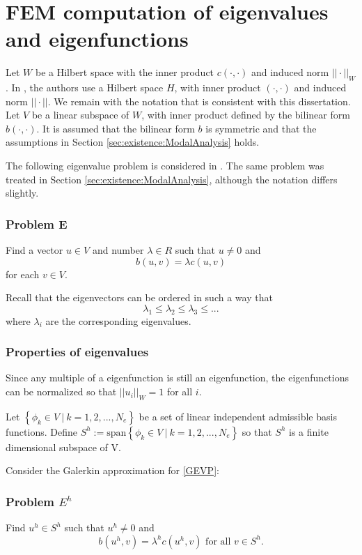 \documentclass[../../main.tex]{subfiles}
\begin{document}
\section{FEM computation of eigenvalues and eigenfunctions}
Let $W$ be a Hilbert space with the inner product $c(\cdot,\cdot)$ and induced norm $||\cdot||_{W}$. In \cite{SF73}, the authors use a Hilbert space $H$, with inner product $(\cdot, \cdot)$ and induced norm $||\cdot||$. We remain with the notation that is consistent with this dissertation. Let $V$ be a linear subspace of $W$, with inner product defined by the bilinear form $b(\cdot,\cdot)$. It is assumed that the bilinear form $b$ is symmetric and that the assumptions in Section \ref{sec:existence:ModalAnalysis} holds.

The following eigenvalue problem is considered in \cite{SF73}. The same problem was treated in Section \ref{sec:existence:ModalAnalysis}, although the notation differs slightly.


\subsubsection*{Problem E}
Find a vector $u \in V$ and number $\lambda \in R$ such that $u \neq 0$ and
\begin{equation}
	b(u,v) = \lambda c(u,v) \label{GEVP}
\end{equation} for each $v \in V$.

Recall that the eigenvectors can be ordered in such a way that \[\lambda_1 \leq \lambda_2 \leq \lambda_3 \leq ...\] where $\lambda_i$ are the corresponding eigenvalues.

\subsubsection*{Properties of eigenvalues}
Since any multiple of a eigenfunction is still an eigenfunction, the eigenfunctions can be normalized so that $||u_i||_{W} = 1$ for all $i$.

Let $\left\{ \phi_k \in V \ | \  k = 1,2,...,N_e \right\}$ be a set of linear independent admissible basis functions. Define $S^h := \text{span}\left\{\phi_k \in V \ | \ k = 1,2,...,N_e\right\}$ so that $S^h$ is a finite dimensional subspace of V. \label{sym:natural} \label{sym:Sh1}

Consider the Galerkin approximation for \eqref{GEVP}:
\subsubsection*{Problem $E^h$}
Find $u^h \in S^h$ such that $u^h \neq 0$ and \[b(u^h, v) = \lambda^h c(u^h,v) \textrm{ for all } v \in S^h.\] 
\end{document}
